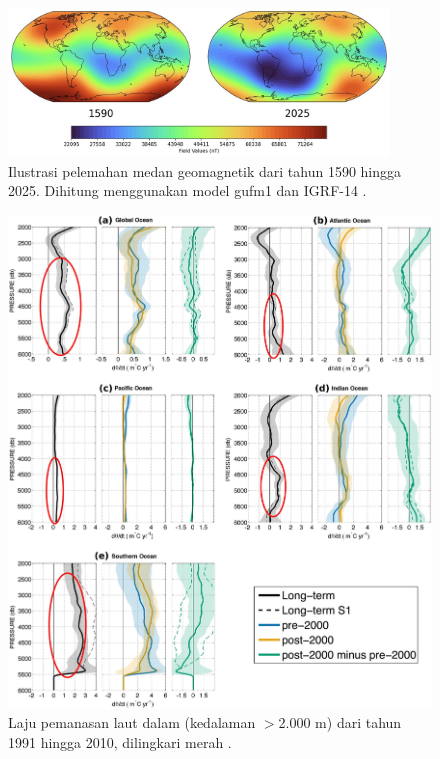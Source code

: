 \documentclass[10pt,twocolumn,letterpaper]{article}
\begin{document}
\begin{figure}[t]
\begin{center}
\includegraphics[width=0.9\textwidth]{saa.jpg}
\end{center}
   \caption{Ilustrasi pelemahan medan geomagnetik dari tahun 1590 hingga 2025. Dihitung menggunakan model gufm1 dan IGRF-14 \cite{125,126}.}
\label{fig:14}
\end{figure}

\begin{figure}[t]
\begin{center}
   \includegraphics[width=1\linewidth]{ocean-highlight.jpg}
\end{center}
   \caption{Laju pemanasan laut dalam (kedalaman $>$2.000 m) dari tahun 1991 hingga 2010, dilingkari merah \cite{132}.}
\label{fig:15}
\label{fig:onecol}
\end{figure}
\end{document}
